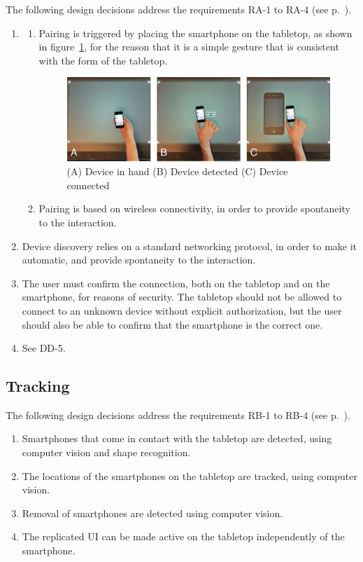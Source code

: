 The following design decisions address the requirements RA-1 to RA-4 (see p.~\pageref{RA}).

\begin{enumerate}[{DA}-1]
\item \hfill
	\begin{enumerate}[{DA-1}a]
	\item Pairing is triggered by placing the smartphone on the tabletop, as shown in figure~\ref{fig:sqPair}, for the reason that it is a simple gesture that is consistent with the form of the tabletop.

\begin{figure}[htb]
  \centering
    \includegraphics[width=0.7\linewidth]{images/sqPair}
  \caption{(A) Device in hand (B) Device detected (C) Device connected}
  \label{fig:sqPair}
\end{figure}

	\item Pairing is based on wireless connectivity, in order to provide spontaneity to the interaction.
	\end{enumerate}
\item Device discovery relies on a standard networking protocol, in order to make it automatic, and provide spontaneity to the interaction.
\item The user must confirm the connection, both on the tabletop and on the smartphone, for reasons of security.
The tabletop should not be allowed to connect to an unknown device without explicit authorization, but the user should also be able to confirm that the smartphone is the correct one.
\item See DD-5.
\end{enumerate}

\subsection{Tracking}

The following design decisions address the requirements RB-1 to RB-4 (see p.~\pageref{RB}).

\label{DB}
\begin{enumerate}[{DB}-1]
\item Smartphones that come in contact with the tabletop are detected, using computer vision and shape recognition.
\item The locations of the smartphones on the tabletop are tracked, using computer vision.
\item Removal of smartphones are detected using computer vision.
\item The replicated UI can be made active on the tabletop independently of the smartphone.
\end{enumerate}

